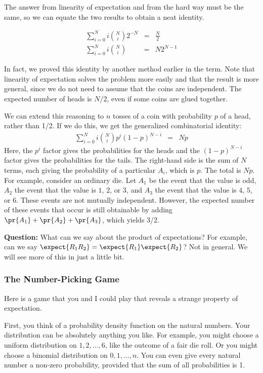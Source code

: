 The answer from linearity of expectation and from the hard way must be
the same, so we can equate the two results to obtain a neat identity.

\begin{eqnarray*}
\sum_{i=0}^N i \binom{N}{i} 2^{-N} & = & \frac{N}{2} \\
\sum_{i=0}^N i \binom{N}{i} & = & N2^{N-1}
\end{eqnarray*}

In fact, we proved this identity by another method earlier in the
term.  Note that linearity of expectation solves the problem more
easily and that the result is more general, since we do not need to
assume that the coins are independent.  The expected number of
heads is $N/2$, even if some coins are glued together.

We can extend this reasoning to $n$ tosses of a coin with probability $p$
of a head, rather than 1/2.  If we do this, we get the generalized
combinatorial identity:
\begin{eqnarray*}
\sum_{i=0}^N i \binom{N}{i} p^i (1-p)^{N-i} & = & N p
\end{eqnarray*}
Here, the $p^i$ factor gives the probabilities for the heads and the
$(1-p)^{N-i}$ factor gives the probabilities for the tails.  The
right-hand side is the sum of $N$ terms, each giving the probability
of a particular $A_i$, which is $p$.  The total is $N p$.  For
example, consider an ordinary die.  Let $A_1$ be the event that the
value is odd, $A_2$ the event that the value is $1$, $2$, or $3$, and
$A_3$ the event that the value is $4$, $5$, or $6$.  These events are
not mutually independent.  However, the expected number of these
events that occur is still obtainable by adding $\pr{A_1} + \pr{A_2} +
\pr{A_3}$, which yields 3/2.

{\bf Question:} What can we say about the product of expectations?
For example, can we say $\expect{R_1 R_2} = \expect{R_1}
\expect{R_2}$?  Not in general. We will see more of this in just a
little bit.



\subsubsection{The Number-Picking Game}

Here is a game that you and I could play that reveals a strange
property of expectation.

First, you think of a probability density function on the natural
numbers.  Your distribution can be absolutely anything you like.  For
example, you might choose a uniform distribution on $1, 2, \dots, 6$,
like the outcome of a fair die roll.  Or you might choose a binomial
distribution on $0, 1, \dots, n$.  You can even give every natural
number a non-zero probability, provided that the sum of all
probabilities is 1.

